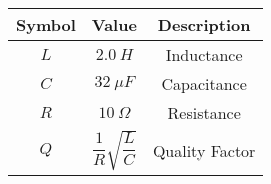 \begin{tabular}{|c|c|c|}
    \hline
     \textbf{Symbol} & \textbf{Value} &
     \textbf{Description}\\
    \hline
     $L$ &  $2.0\ H$ & Inductance\\
    \hline 
     $C$ &  $32\ \mu F$ & Capacitance \\
    \hline
     $R$ &  $10\ \Omega$ & Resistance\\
    \hline
     $Q$ & $\dfrac{1}{R}\sqrt{\dfrac{L}{C}}$ & Quality Factor\\[6pt]
    \hline
\end{tabular}
